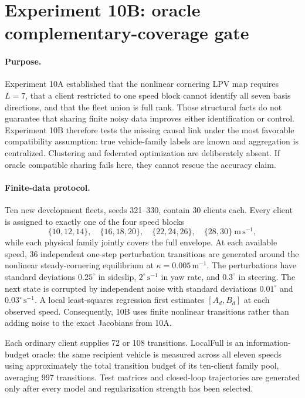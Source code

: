 \section{Experiment 10B: oracle complementary-coverage gate}
\label{sec:experiment10b}

\paragraph{Purpose.}
Experiment 10A established that the nonlinear cornering LPV map requires
$L=7$, that a client restricted to one speed block cannot identify all seven
basis directions, and that the fleet union is full rank. Those structural facts
do not guarantee that sharing finite noisy data improves either identification
or control. Experiment 10B therefore tests the missing causal link under the
most favorable compatibility assumption: true vehicle-family labels are known
and aggregation is centralized. Clustering and federated optimization are
deliberately absent. If oracle compatible sharing fails here, they cannot rescue
the accuracy claim.

\paragraph{Finite-data protocol.}
Ten new development fleets, seeds 321--330, contain 30 clients each. Every
client is assigned to exactly one of the four speed blocks
\begin{equation}
 \{10,12,14\},\quad \{16,18,20\},\quad
 \{22,24,26\},\quad \{28,30\}\ \mathrm{m\,s}^{-1},
\end{equation}
while each physical family jointly covers the full envelope. At each available
speed, 36 independent one-step perturbation transitions are generated around
the nonlinear steady-cornering equilibrium at
$\kappa=0.005\,\mathrm{m}^{-1}$. The perturbations have standard deviations
$0.25^\circ$ in sideslip, $2^\circ\,\mathrm{s}^{-1}$ in yaw rate, and
$0.3^\circ$ in steering. The next state is corrupted by independent noise with
standard deviations $0.01^\circ$ and $0.03^\circ\,\mathrm{s}^{-1}$. A local
least-squares regression first estimates $[A_d,B_d]$ at each observed speed.
Consequently, 10B uses finite nonlinear transitions rather than adding noise to
the exact Jacobians from 10A.

Each ordinary client supplies 72 or 108 transitions. LocalFull is an
information-budget oracle: the same recipient vehicle is measured across all
eleven speeds using approximately the total transition budget of its ten-client
family pool, averaging 997 transitions. Test matrices and closed-loop
trajectories are generated only after every model and regularization strength
has been selected.

